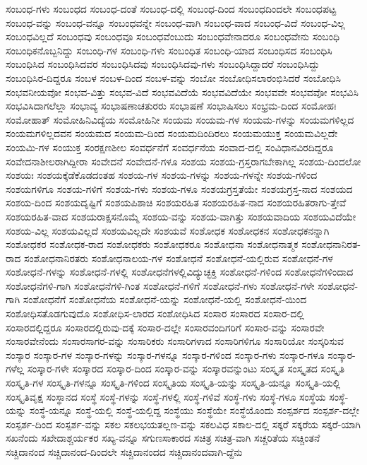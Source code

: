 {ಸಂಬಂಧ-ಗಳು
ಸಂಬಂಧದ
ಸಂಬಂಧ-ದಂತೆ
ಸಂಬಂಧ-ದಲ್ಲಿ
ಸಂಬಂಧ-ದಿಂದ
ಸಂಬಂಧದಿಂದಲೇ
ಸಂಬಂಧಪಟ್ಟ
ಸಂಬಂಧ-ವನ್ನು
ಸಂಬಂಧ-ವನ್ನೂ
ಸಂಬಂಧವನ್ನೇ
ಸಂಬಂಧ-ವಾಗಿ
ಸಂಬಂಧ-ವಾದ
ಸಂಬಂಧ-ವಿದೆ
ಸಂಬಂಧ-ವಿಲ್ಲ
ಸಂಬಂಧವಿಲ್ಲದೆ
ಸಂಬಂಧವು
ಸಂಬಂಧವೂ
ಸಂಬಂಧವೆಂಬುದು
ಸಂಬಂಧವೇನಾದರೂ
ಸಂಬಂಧವೇನು
ಸಂಬಂಧಿ
ಸಂಬಂಧಿಕನೊಬ್ಬನಿದ್ದು
ಸಂಬಂಧಿ-ಗಳ
ಸಂಬಂಧಿ-ಗಳು
ಸಂಬಂಧಿತ
ಸಂಬಂಧಿ-ಯಾದ
ಸಂಬಂಧಿಸದ
ಸಂಬಂಧಿಸಿ
ಸಂಬಂಧಿಸಿದ
ಸಂಬಂಧಿಸಿದವರ
ಸಂಬಂಧಿಸಿದವು
ಸಂಬಂಧಿಸಿದವು-ಗಳು
ಸಂಬಂಧಿಸಿದ್ದಾದರೆ
ಸಂಬಂಧಿಸಿದ್ದು
ಸಂಬಂಧಿಸಿರ-ದಿದ್ದರೂ
ಸಂಬಳ
ಸಂಬಳ-ದಿಂದ
ಸಂಬಳ-ವನ್ನು
ಸಂಬೋ
ಸಂಬೋಧಿಸಲಾರಂಭಿಸಿದರೆ
ಸಂಬೋಧಿಸಿ
ಸಂಭವನೀಯವೋ
ಸಂಭವ-ವಿತ್ತು
ಸಂಭವ-ವಿದೆ
ಸಂಭವವಿದೆಯೆ
ಸಂಭವವಿದೆಯೇ
ಸಂಭವವೇ
ಸಂಭವವೋ
ಸಂಭವಿಸಿ
ಸಂಭವಿಸಿದಾಗಲೆಲ್ಲಾ
ಸಂಭಾವ್ಯ
ಸಂಭಾಷಣಾಚತುರರು
ಸಂಭಾಷಣೆ
ಸಂಭಾಷಿಸಲು
ಸಂಭ್ರಮ-ದಿಂದ
ಸಂಮೋಹಃ
ಸಂಮೋಹಾತ್
ಸಂಮೋಹಿನಿವಿದ್ಯೆಯ
ಸಂಮೋಹಿನೀ
ಸಂಯಮ
ಸಂಯಮ-ಗಳ
ಸಂಯಮ-ಗಳನ್ನು
ಸಂಯಮಗಳಿಲ್ಲದ
ಸಂಯಮಗಳಿಲ್ಲದವನ
ಸಂಯಮದ
ಸಂಯಮ-ದಿಂದ
ಸಂಯಮದಿಂದಿರಲು
ಸಂಯಮಯುಕ್ತ
ಸಂಯಮವಿಲ್ಲದೇ
ಸಂಯಮಿ-ಗಳ
ಸಂಯುಕ್ತ
ಸಂರಕ್ಷಣಶೀಲ
ಸಂವರ್ಧನೆಗೆ
ಸಂವರ್ಧನೆಯ
ಸಂವಾದ-ದಲ್ಲಿ
ಸಂವಿಧಾನವಿರದಿದ್ದರೂ
ಸಂವೇದನಾಶೀಲರಾಗಿದ್ದೀರಾ
ಸಂವೇದನೆ
ಸಂವೇದನೆ-ಗಳೂ
ಸಂಶಯ
ಸಂಶಯ-ಗ್ರಸ್ತರಾಗಬೇಕಾಗಿಲ್ಲ
ಸಂಶಯ-ದಿಂದಲೋ
ಸಂಶಯಃ
ಸಂಶಯಕ್ಕೆಡೆಕೊಡದಂತಹ
ಸಂಶಯ-ಗಳ
ಸಂಶಯ-ಗಳನ್ನು
ಸಂಶಯ-ಗಳನ್ನೇ
ಸಂಶಯ-ಗಳಿಂದ
ಸಂಶಯಗಳಿಗೂ
ಸಂಶಯ-ಗಳಿಗೆ
ಸಂಶಯ-ಗಳು
ಸಂಶಯ-ಗಳೂ
ಸಂಶಯಗ್ರಸ್ತತೆಯೇ
ಸಂಶಯಗ್ರಸ್ತ-ನಾದ
ಸಂಶಯದ
ಸಂಶಯ-ದಿಂದ
ಸಂಶಯದೃಷ್ಟಿಗೆ
ಸಂಶಯಪಿಶಾಚಿ
ಸಂಶಯರಹಿತ
ಸಂಶಯರಹಿತ-ನಾದ
ಸಂಶಯರಹಿತರಾಗು-ತ್ತೇವೆ
ಸಂಶಯರಹಿತ-ವಾದ
ಸಂಶಯರಾಕ್ಷಸನೊಮ್ಮೆ
ಸಂಶಯ-ವನ್ನು
ಸಂಶಯ-ವಾಗಿತ್ತು
ಸಂಶಯವಾದಿಯ
ಸಂಶಯವಿದೆಯೇ
ಸಂಶಯ-ವಿಲ್ಲ
ಸಂಶಯವಿಲ್ಲದೆ
ಸಂಶಯವಿಲ್ಲದೇ
ಸಂಶಯವೆ
ಸಂಶೋಧಕ
ಸಂಶೋಧಕನ
ಸಂಶೋಧಕನನ್ನಾಗಿ
ಸಂಶೋಧಕರ
ಸಂಶೋಧಕ-ರಾದ
ಸಂಶೋಧಕರು
ಸಂಶೋಧಕರೂ
ಸಂಶೋಧನಾ
ಸಂಶೋಧನಾತ್ಮಕ
ಸಂಶೋಧನಾನಿರತ-ರಾದ
ಸಂಶೋಧನಾನಿರತರು
ಸಂಶೋಧನಾಲಯ-ಗಳ
ಸಂಶೋಧನೆ
ಸಂಶೋಧನೆ-ಯಲ್ಲಿರುವ
ಸಂಶೋಧನೆ-ಗಳ
ಸಂಶೋಧನೆ-ಗಳನ್ನು
ಸಂಶೋಧನೆ-ಗಳಲ್ಲಿ
ಸಂಶೋಧನೆಗಳಲ್ಲಿವಿದ್ಯುಚ್ಛಕ್ತಿ
ಸಂಶೋಧನೆ-ಗಳಿಂದ
ಸಂಶೋಧನೆಗಳಿಂದಾದ
ಸಂಶೋಧನೆಗಳಿ-ಗಾಗಿ
ಸಂಶೋಧನೆಗಳಿ-ಗಿಂತ
ಸಂಶೋಧನೆ-ಗಳಿಗೆ
ಸಂಶೋಧನೆ-ಗಳು
ಸಂಶೋಧನೆ-ಗಳೇ
ಸಂಶೋಧನೆ-ಗಾಗಿ
ಸಂಶೋಧನೆಗೆ
ಸಂಶೋಧನೆಯ
ಸಂಶೋಧನೆ-ಯನ್ನು
ಸಂಶೋಧನೆ-ಯಲ್ಲಿ
ಸಂಶೋಧನೆ-ಯಿಂದ
ಸಂಶೋಧಿಸತೊಡಗುವುದೊ
ಸಂಶೋಧಿಸ-ಲಾರದ
ಸಂಶೋಧಿಸಿದ
ಸಂಸಾರ
ಸಂಸಾರದ
ಸಂಸಾರ-ದಲ್ಲಿ
ಸಂಸಾರದಲ್ಲಿದ್ದರೂ
ಸಂಸಾರದಲ್ಲಿರುವು-ದಕ್ಕೆ
ಸಂಸಾರ-ದಲ್ಲೇ
ಸಂಸಾರವಂದಿಗರಿಗೆ
ಸಂಸಾರ-ವನ್ನು
ಸಂಸಾರವೇ
ಸಂಸಾರವೇನೆಂದು
ಸಂಸಾರಸಾಗರ-ವನ್ನು
ಸಂಸಾರಿಕರು
ಸಂಸಾರಿಗಳಾದ
ಸಂಸಾರಿಗಳಿಗೂ
ಸಂಸಾರಿಯೋ
ಸಂಸ್ಕರಿಸುವ
ಸಂಸ್ಕಾರ
ಸಂಸ್ಕಾರ-ಗಳ
ಸಂಸ್ಕಾರ-ಗಳನ್ನು
ಸಂಸ್ಕಾರ-ಗಳನ್ನೂ
ಸಂಸ್ಕಾರ-ಗಳಿಂದ
ಸಂಸ್ಕಾರ-ಗಳು
ಸಂಸ್ಕಾರ-ಗಳೂ
ಸಂಸ್ಕಾರ-ಗಳೆಲ್ಲ
ಸಂಸ್ಕಾರ-ಗಳೇ
ಸಂಸ್ಕಾರದ
ಸಂಸ್ಕಾರ-ದಿಂದ
ಸಂಸ್ಕಾರ-ವನ್ನು
ಸಂಸ್ಕಾರವನ್ನುಂಟು
ಸಂಸ್ಕೃತ
ಸಂಸ್ಕೃತದ
ಸಂಸ್ಕೃತಿ
ಸಂಸ್ಕೃತಿ-ಗಳ
ಸಂಸ್ಕೃತಿ-ಗಳನ್ನೂ
ಸಂಸ್ಕೃತಿ-ಗಳಿಂದ
ಸಂಸ್ಕೃತಿಯ
ಸಂಸ್ಕೃತಿ-ಯನ್ನು
ಸಂಸ್ಕೃತಿ-ಯನ್ನೂ
ಸಂಸ್ಕೃತಿ-ಯಲ್ಲಿ
ಸಂಸ್ಕೃತಿವೃಕ್ಷ
ಸಂಸ್ಥಾನದ
ಸಂಸ್ಥೆ
ಸಂಸ್ಥೆ-ಗಳನ್ನು
ಸಂಸ್ಥೆ-ಗಳಲ್ಲಿ
ಸಂಸ್ಥೆ-ಗಳಿವೆ
ಸಂಸ್ಥೆ-ಗಳು
ಸಂಸ್ಥೆ-ಗಳೂ
ಸಂಸ್ಥೆಯ
ಸಂಸ್ಥೆ-ಯನ್ನು
ಸಂಸ್ಥೆ-ಯನ್ನೂ
ಸಂಸ್ಥೆ-ಯಲ್ಲಿ
ಸಂಸ್ಥೆ-ಯಲ್ಲಿದ್ದ
ಸಂಸ್ಥೆಯು
ಸಂಸ್ಥೆಯೇ
ಸಂಸ್ಥೆಯೊಂದು
ಸಂಸ್ಪರ್ಶದ
ಸಂಸ್ಪರ್ಶ-ದಲ್ಲೇ
ಸಂಸ್ಪರ್ಶ-ದಿಂದ
ಸಂಸ್ಪರ್ಶ-ವನ್ನು
ಸಕಲ
ಸಕಲಭಯತಲ್ಲಣ-ವನ್ನು
ಸಕಲವಿಧ
ಸಕಾಲ-ದಲ್ಲಿ
ಸಕ್ಕರೆ
ಸಕ್ಕರೆಯ
ಸಕ್ಕರೆ-ಯಾಗಿ
ಸಖನೆಂದು
ಸಖೇದಾಶ್ಚರ್ಯಕರ
ಸಖ್ಯ-ವನ್ನೂ
ಸಗುಣಸಾಕಾರದ
ಸಚಿತ್ರ
ಸಚಿತ್ರ-ವಾಗಿ
ಸಚ್ಚರಿತೆಯ
ಸಚ್ಚಿಂತನೆ
ಸಚ್ಚಿದಾನಂದ
ಸಚ್ಚಿದಾನಂದ-ದಿಂದಲೇ
ಸಚ್ಚಿದಾನಂದದ
ಸಚ್ಚಿದಾನಂದವಾಗಿ-ದ್ದೆನು
}
